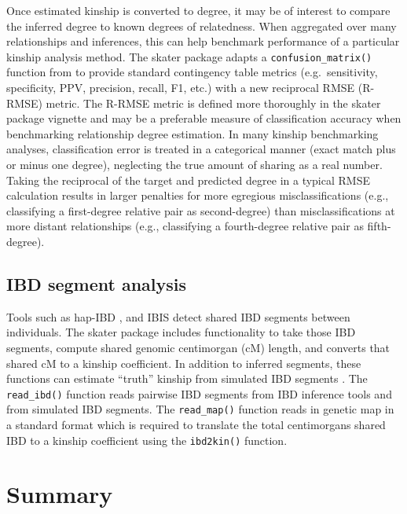 \documentclass[9pt,a4paper,]{extarticle}
\begin{document}
Once estimated kinship is converted to degree, it may be of interest to compare the inferred degree to known degrees of relatedness. When aggregated over many relationships and inferences, this can help benchmark performance of a particular kinship analysis method. The skater package adapts a \texttt{confusion\_matrix()} function from \citet{clark2021} to provide standard contingency table metrics (e.g.~sensitivity, specificity, PPV, precision, recall, F1, etc.) with a new reciprocal RMSE (R-RMSE) metric. The R-RMSE metric is defined more thoroughly in the skater package vignette and may be a preferable measure of classification accuracy when benchmarking relationship degree estimation. In many kinship benchmarking analyses, classification error is treated in a categorical manner (exact match plus or minus one degree), neglecting the true amount of sharing as a real number. Taking the reciprocal of the target and predicted degree in a typical RMSE calculation results in larger penalties for more egregious misclassifications (e.g., classifying a first-degree relative pair as second-degree) than misclassifications at more distant relationships (e.g., classifying a fourth-degree relative pair as fifth-degree).

\hypertarget{ibd-segment-analysis}{%
\subsection{IBD segment analysis}\label{ibd-segment-analysis}}

Tools such as hap-IBD \citep{zhou2020}, and IBIS \citep{seidman2020} detect shared IBD segments between individuals. The skater package includes functionality to take those IBD segments, compute shared genomic centimorgan (cM) length, and converts that shared cM to a kinship coefficient. In addition to inferred segments, these functions can estimate ``truth'' kinship from simulated IBD segments \citep{caballero2019}. The \texttt{read\_ibd()} function reads pairwise IBD segments from IBD inference tools and from simulated IBD segments. The \texttt{read\_map()} function reads in genetic map in a standard format which is required to translate the total centimorgans shared IBD to a kinship coefficient using the \texttt{ibd2kin()} function.

\hypertarget{summary}{%
\section{Summary}\label{summary}}
\end{document}

